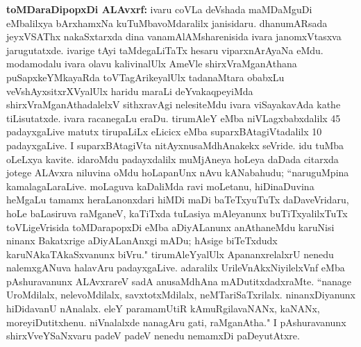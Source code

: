 {\textbf{toMDaraDipopxDi ALAvxrf:}} ivaru coVLa deVshada maMDaMguDi eMbalilxya bArxhamxNa kuTuMbavoMdaralilx janisidaru. dhanumARsada jeyxVSAThx nakaSxtarxda dina vanamAlAMsharenisida ivara janomxVtasxva jarugutatxde. ivarige tAyi taMdegaLiTaTx hesaru viparxnArAyaNa eMdu. modamodalu ivara olavu kalivinalUlx AmeVle shirxVraMganAthana puSapxkeYMkayaRda toVTagArikeyalUlx tadanaMtara obabxLu veVshAyxsitxrXVyalUlx haridu maraLi deYvakaqpeyiMda shirxVraMganAthadalelxV sithxravAgi nelesiteMdu ivara viSayakavAda kathe tiLisutatxde. ivara racanegaLu eraDu. tirumAleY eMba niVLagxbabxdalilx {\rm 45} padayxgaLive matutx tirupaLiLx eLicicx eMba suparxBAtagiVtadalilx {\rm 10} padayxgaLive. I suparxBAtagiVta nitAyxnusaMdhAnakekx seVride. idu tuMba oLeLxya kavite. idaroMdu padayxdalilx muMjAneya hoLeya daDada citarxda jotege ALAvxra niluvina oMdu hoLapanUnx nAvu kANabahudu; ``naruguMpina kamalagaLaraLive. moLaguva kaDaliMda ravi moLetanu, hiDinaDuvina heMgaLu tamamx heraLanonxdari hiMDi maDi baTeTxyuTuTx daDaveVridaru, hoLe baLasiruva raMganeV, kaTiTxda tuLasiya mAleyanunx buTiTxyalilxTuTx toVLigeVrisida toMDarapopxDi eMba aDiyALanunx anAthaneMdu karuNisi ninanx Bakatxrige aDiyALanAnxgi mADu; hAsige biTeTxdudx karuNAkaTAkaSxvanunx biVru." tirumAleYyalUlx ApananxrelalxrU nenedu nalemxgANuva halavAru padayxgaLive. adaralilx UrileVnAkxNiyilelxVnf eMba pAshuravanunx ALAvxrareV sadA anusaMdhAna mADutitxdadxraMte. ``nanage UroMdilalx, nelevoMdilalx, savxtotxMdilalx, neMTariSaTxrilalx. ninanxDiyanunx hiDidavanU nAnalalx. eleY paramamUtiR kAmuRgilavaNANx, kaNANx, moreyiDutitxhenu. niVnalalxde nanagAru gati, raMganAtha." I pAshuravanunx shirxVveYSaNxvaru padeV padeV nenedu nemamxDi paDeyutAtxre.

